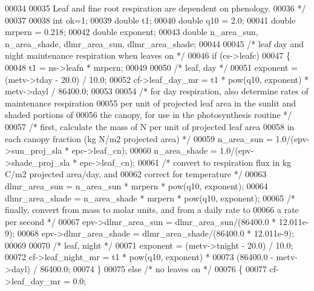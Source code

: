 \begin{DoxyCode}
00034 \textcolor{comment}{    }
00035 \textcolor{comment}{    Leaf and fine root respiration are dependent on phenology.}
00036 \textcolor{comment}{    */}
00037     
00038     \textcolor{keywordtype}{int} ok=1;
00039     \textcolor{keywordtype}{double} t1;
00040     \textcolor{keywordtype}{double} q10 = 2.0;
00041     \textcolor{keywordtype}{double} mrpern = 0.218;
00042     \textcolor{keywordtype}{double} exponent;
00043     \textcolor{keywordtype}{double} n\_area\_sun, n\_area\_shade, dlmr\_area\_sun, dlmr\_area\_shade;
00044     
00045     \textcolor{comment}{/* leaf day and night maintenance respiration when leaves on */}
00046     \textcolor{keywordflow}{if} (cs->leafc)
00047     \{
00048         t1 = ns->leafn * mrpern;
00049         
00050         \textcolor{comment}{/* leaf, day */}
00051         exponent = (metv->tday - 20.0) / 10.0;
00052         cf->leaf\_day\_mr = t1 * pow(q10, exponent) * metv->dayl / 86400.0;
00053 
00054         \textcolor{comment}{/* for day respiration, also determine rates of maintenance respiration}
00055 \textcolor{comment}{        per unit of projected leaf area in the sunlit and shaded portions of}
00056 \textcolor{comment}{        the canopy, for use in the photosynthesis routine */}
00057         \textcolor{comment}{/* first, calculate the mass of N per unit of projected leaf area}
00058 \textcolor{comment}{        in each canopy fraction (kg N/m2 projected area) */}
00059         n\_area\_sun   = 1.0/(epv->sun\_proj\_sla * epc->leaf\_cn);
00060         n\_area\_shade = 1.0/(epv->shade\_proj\_sla * epc->leaf\_cn);
00061         \textcolor{comment}{/* convert to respiration flux in kg C/m2 projected area/day, and}
00062 \textcolor{comment}{        correct for temperature */}
00063         dlmr\_area\_sun   = n\_area\_sun * mrpern * pow(q10, exponent);
00064         dlmr\_area\_shade = n\_area\_shade * mrpern * pow(q10, exponent);
00065         \textcolor{comment}{/* finally, convert from mass to molar units, and from a daily rate to }
00066 \textcolor{comment}{        a rate per second */}
00067         epv->dlmr\_area\_sun = dlmr\_area\_sun/(86400.0 * 12.011e-9);
00068         epv->dlmr\_area\_shade = dlmr\_area\_shade/(86400.0 * 12.011e-9);
00069         
00070         \textcolor{comment}{/* leaf, night */}
00071         exponent = (metv->tnight - 20.0) / 10.0;
00072         cf->leaf\_night\_mr = t1 * pow(q10, exponent) * 
00073             (86400.0 - metv->dayl) / 86400.0;
00074     \}
00075     \textcolor{keywordflow}{else} \textcolor{comment}{/* no leaves on */}
00076     \{
00077         cf->leaf\_day\_mr = 0.0;

\end{DoxyCode}
